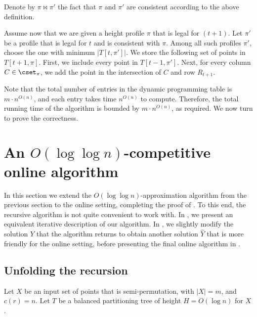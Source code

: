 \documentclass{toc}
\begin{document}
Denote by $\pi \bowtie \pi'$ the fact that $\pi$ and $\pi'$ are consistent according to the above definition. 


Assume now that we are given a height profile $\pi$ that is legal for $(t+1)$. 
Let $\pi'$ be a profile that is legal for $t$ and is consistent with $\pi$. Among all such profiles $\pi'$, choose the one with minimum $|T[t,\pi']|$. We store the following set of points in $T[t+1,\pi]$. First, we include every point in $T[t-1,\pi']$. Next, for every column $C\in \cset_{\pi}$, we add the point in the intersection of $C$ and row $R_{t+1}$.

Note that the total number of entries in the dynamic programming table is $m\cdot n^{O(n)}$, and each entry takes time $n^{O(n)}$ to compute. Therefore, the total running time of the algorithm is bounded by $m\cdot n^{O(n)}$, as required. We now turn to prove the correctness.
\fi


%

\newcommand{\first}{{\sf first}} 

\newcommand{\last}{{\sf last}} 


\newcommand{\proj}{{\sf proj}} 

\section{An $O(\log \log n)$-competitive online algorithm}  
\label{sec: online}

In this section we extend the $O(\log\log n)$-approximation algorithm from the previous section to the online setting, completing the proof of . To this end, the recursive algorithm is not quite convenient to work with. In , we present an equivalent iterative description of our algorithm. In , we slightly modify the solution $Y$ that the algorithm returns to obtain another solution $\hat{Y}$ that is more friendly for the online setting, before presenting the final online algorithm in .


\subsection{Unfolding the recursion} 
\label{subsec: unfold}  
 
Let $X$ be an input set of points that is semi-permutation, with $|X|=m$, and $c(r)=n$. Let $T$ be a balanced partitioning tree of height $H=O(\log n)$ for $X$. %
\end{document}
